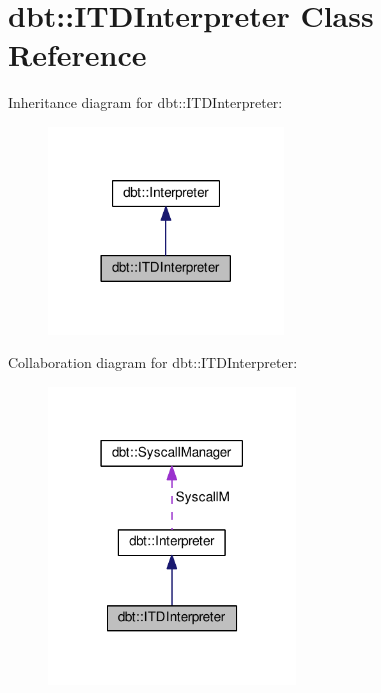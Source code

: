 \hypertarget{classdbt_1_1_i_t_d_interpreter}{}\section{dbt\+:\+:I\+T\+D\+Interpreter Class Reference}
\label{classdbt_1_1_i_t_d_interpreter}


Inheritance diagram for dbt\+:\+:I\+T\+D\+Interpreter\+:\nopagebreak
\begin{figure}[H]
\begin{center}
\leavevmode
\includegraphics[width=177pt]{classdbt_1_1_i_t_d_interpreter__inherit__graph}
\end{center}
\end{figure}


Collaboration diagram for dbt\+:\+:I\+T\+D\+Interpreter\+:\nopagebreak
\begin{figure}[H]
\begin{center}
\leavevmode
\includegraphics[width=186pt]{classdbt_1_1_i_t_d_interpreter__coll__graph}
\end{center}
\end{figure}
